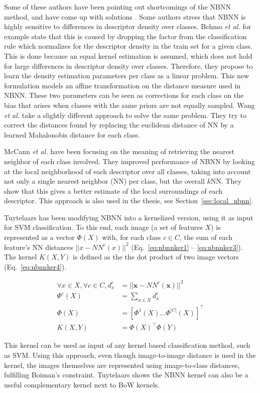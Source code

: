 Some of these authors have been pointing out shortcomings of the NBNN method, and have come up with solutions \cite{behmo2010towards, mccann2012local, timofte2012iterative, wang2011improved}. Some authors stress that NBNN is highly sensitive to differences in descriptor density over classes. Behmo \emph{et al.} \cite{behmo2010towards} for example state that this is caused by dropping the factor from the classification rule which normalizes for the descriptor density in the train set for a given class. This is done because an equal kernel estimation is assumed, which does not hold for large differences in descriptor density over classes. Therefore, they propose to learn the density estimation parameters per class as a linear problem. This new formulation models an affine transformation on the distance measure used in NBNN. These two parameters can be seen as corrections for each class on the bias that arises when classes with the same priors are not equally sampled. Wang \emph{et al.} \cite{wang2011improved} take a slightly different approach to solve the same problem. They try to correct the distances found by replacing the euclidean distance of NN by a learned Mahalonobis distance for each class.

McCann \emph{et al.} \cite{mccann2012local} have been focusing on the meaning of retrieving the nearest neighbor of each class involved. They improved performance of NBNN by looking at the local neighborhood of each descriptor over all classes, taking into account not only a single nearest neighbor (NN) per class, but the overall $k$NN. They show that this gives a better estimate of the local surroundings of each descriptor. This approach is also used in the thesis, see Section~\ref{sec:local_nbnn}.

Tuytelaars \cite{tuytelaars2011nbnn} has been modifying NBNN into a kernelized version, using it as input for SVM classification. To this end, each image (a set of features $X$) is represented as a vector $\Phi(X)$ with, for each class $c \in C$, the sum of each feature's NN distances $||x - NN^c(x)||^2$ (Eq.~\eqref{eq:nbnnker1} -- \eqref{eq:nbnnker3}). The kernel $K(X,Y)$ is defined as the the dot product of two image vectors (Eq.~\eqref{eq:nbnnker4}).

\begin{align}
    \forall x \in X, \forall c \in C, d_x^c &= ||\mathbf{x} - NN^c(\mathbf{x})||^2 \label{eq:nbnnker1}\\
    \Phi^c(X) &= \sum_{x\in X} d_x^c \label{eq:nbnnker2}\\
    \Phi(X) &= [\Phi^1(X) \ldots \Phi^{|C|}(X)]^\top \label{eq:nbnnker3}\\
    K(X,Y) &= \Phi(X)^\top \Phi(Y) \label{eq:nbnnker4}
\end{align}

This kernel can be used as input of any kernel based classification method, such as SVM. Using this approach, even though image-to-image distance is used in the kernel, the images themselves are represented using image-to-class distances, fulfilling Boiman's constraint. Tuytelaars shows the NBNN kernel can also be a useful complementary kernel next to BoW kernels.

